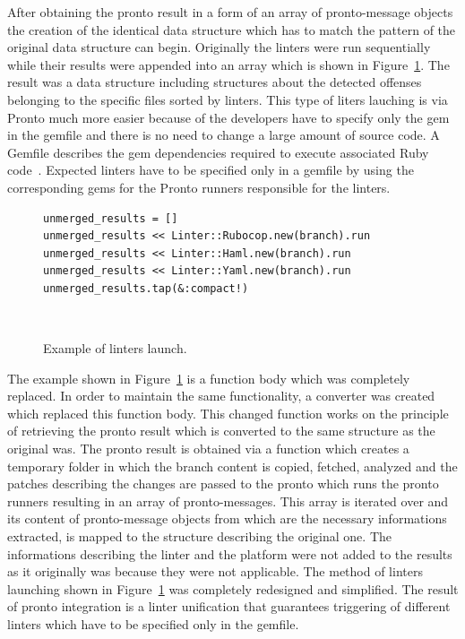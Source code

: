 After obtaining the pronto result in a form of an array of pronto-message objects the creation of the identical data structure which has to match the pattern of the original data structure can begin. Originally the linters were run sequentially while their results were appended into an array which is shown in Figure~\ref{fig:run_all_linters}. The result was a data structure including structures about the detected offenses belonging to the specific files sorted by linters. This type of liters lauching is via Pronto much more easier because of the developers have to specify only the gem in the gemfile and there is no need to change a large amount of source code. A Gemfile describes the gem dependencies required to execute associated Ruby code~\cite{Gemfile}. Expected linters have to be specified only in a gemfile by using the corresponding gems for the Pronto runners responsible for the linters.

\begin{figure}[H]
\begin{lstlisting}[basicstyle=\scriptsize, xleftmargin=.27\textwidth]
unmerged_results = []
unmerged_results << Linter::Rubocop.new(branch).run
unmerged_results << Linter::Haml.new(branch).run
unmerged_results << Linter::Yaml.new(branch).run
unmerged_results.tap(&:compact!)
\end{lstlisting}
\hfill\\[-3em]
\caption{Example of linters launch.}
\label{fig:run_all_linters}
\end{figure}

The example shown in Figure~\ref{fig:run_all_linters} is a function body which was completely replaced. In order to maintain the same functionality, a converter was created which replaced this function body. This changed function works on the principle of retrieving the pronto result which is converted to the same structure as the original was. The pronto result is obtained via a function which creates a temporary folder in which the branch content is copied, fetched, analyzed and the patches describing the changes are passed to the pronto which runs the pronto runners resulting in an array of pronto-messages. This array is iterated over and its content of pronto-message objects from which are the necessary informations extracted, is mapped to the structure describing the original one. The informations describing the linter and the platform were not added to the results as it originally was because they were not applicable. The method of linters launching shown in Figure~\ref{fig:run_all_linters} was completely redesigned and simplified. The result of pronto integration is a linter unification that guarantees triggering of different linters which have to be specified only in the gemfile.\\

